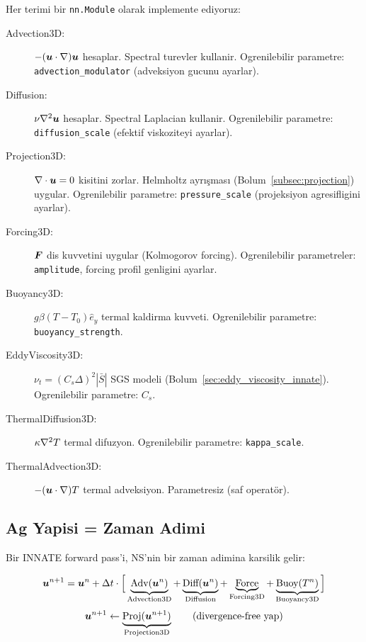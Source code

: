 Her terimi bir \texttt{nn.Module} olarak implemente ediyoruz:

\begin{description}
\item[Advection3D:] $-(\bm{u}\cdot\nabla)\bm{u}$ hesaplar. Spectral turevler kullanir. Ogrenilebilir parametre: \texttt{advection\_modulator} (adveksiyon gucunu ayarlar).

\item[Diffusion:] $\nu\nabla^2\bm{u}$ hesaplar. Spectral Laplacian kullanir. Ogrenilebilir parametre: \texttt{diffusion\_scale} (efektif viskoziteyi ayarlar).

\item[Projection3D:] $\nabla \cdot\bm{u} = 0$ kisitini zorlar. Helmholtz ayrışması (Bolum~\ref{subsec:projection}) uygular. Ogrenilebilir parametre: \texttt{pressure\_scale} (projeksiyon agresifligini ayarlar).

\item[Forcing3D:] $\bm{F}$ dis kuvvetini uygular (Kolmogorov forcing). Ogrenilebilir parametreler: \texttt{amplitude}, forcing profil genligini ayarlar.

\item[Buoyancy3D:] $g\beta(T-T_0)\hat{e}_y$ termal kaldirma kuvveti. Ogrenilebilir parametre: \texttt{buoyancy\_strength}.

\item[EddyViscosity3D:] $\nu_t = (C_s\Delta)^2|\bar{S}|$ SGS modeli (Bolum~\ref{sec:eddy_viscosity_innate}). Ogrenilebilir parametre: $C_s$.

\item[ThermalDiffusion3D:] $\kappa\nabla^2 T$ termal difuzyon. Ogrenilebilir parametre: \texttt{kappa\_scale}.

\item[ThermalAdvection3D:] $-(\bm{u}\cdot\nabla)T$ termal adveksiyon. Parametresiz (saf operatör).
\end{description}

\subsection{Ag Yapisi = Zaman Adimi}

Bir INNATE forward pass'i, NS'nin bir zaman adimina karsilik gelir:

\begin{equation}
\bm{u}^{n+1} = \bm{u}^n + \Delta t\cdot\Big[\underbrace{\text{Adv}(\bm{u}^n)}_{\text{Advection3D}} + \underbrace{\text{Diff}(\bm{u}^n)}_{\text{Diffusion}} + \underbrace{\text{Force}}_{\text{Forcing3D}} + \underbrace{\text{Buoy}(T^n)}_{\text{Buoyancy3D}}\Big]
\label{eq:innate_step1}
\end{equation}
\begin{equation}
\bm{u}^{n+1} \leftarrow \underbrace{\text{Proj}(\bm{u}^{n+1})}_{\text{Projection3D}} \qquad\text{(divergence-free yap)}
\label{eq:innate_step2}
\end{equation}

